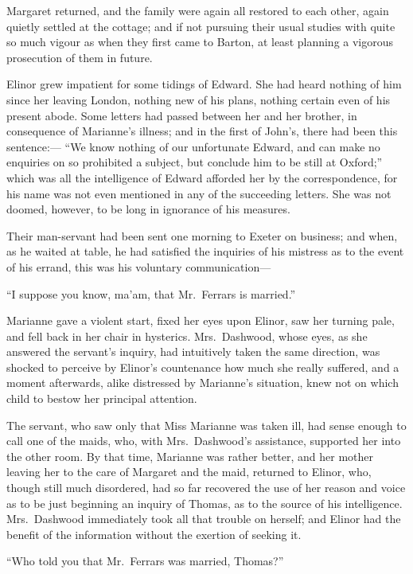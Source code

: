\documentclass{article}
\begin{document}
Margaret returned, and the family were again all
restored to each other, again quietly settled at the cottage;
and if not pursuing their usual studies with quite
so much vigour as when they first came to Barton,
at least planning a vigorous prosecution of them in future.

Elinor grew impatient for some tidings of Edward.
She had heard nothing of him since her leaving London,
nothing new of his plans, nothing certain even of his
present abode.  Some letters had passed between her
and her brother, in consequence of Marianne's illness;
and in the first of John's, there had been this sentence:---%
``We know nothing of our unfortunate Edward, and can make no
enquiries on so prohibited a subject, but conclude him
to be still at Oxford;'' which was all the intelligence
of Edward afforded her by the correspondence, for his name
was not even mentioned in any of the succeeding letters.
She was not doomed, however, to be long in ignorance of
his measures.

Their man-servant had been sent one morning to Exeter
on business; and when, as he waited at table, he had
satisfied the inquiries of his mistress as to the event
of his errand, this was his voluntary communication---%

``I suppose you know, ma'am, that Mr.\ Ferrars is married.''

Marianne gave a violent start, fixed her eyes
upon Elinor, saw her turning pale, and fell back in her
chair in hysterics.  Mrs.\ Dashwood, whose eyes, as she
answered the servant's inquiry, had intuitively taken
the same direction, was shocked to perceive by Elinor's
countenance how much she really suffered, and a moment
afterwards, alike distressed by Marianne's situation,
knew not on which child to bestow her principal attention.

The servant, who saw only that Miss Marianne was
taken ill, had sense enough to call one of the maids,
who, with Mrs.\ Dashwood's assistance, supported her into
the other room.  By that time, Marianne was rather better,
and her mother leaving her to the care of Margaret
and the maid, returned to Elinor, who, though still
much disordered, had so far recovered the use of her reason
and voice as to be just beginning an inquiry of Thomas,
as to the source of his intelligence.  Mrs.\ Dashwood
immediately took all that trouble on herself; and Elinor
had the benefit of the information without the exertion
of seeking it.

``Who told you that Mr.\ Ferrars was married, Thomas?''
\end{document}
